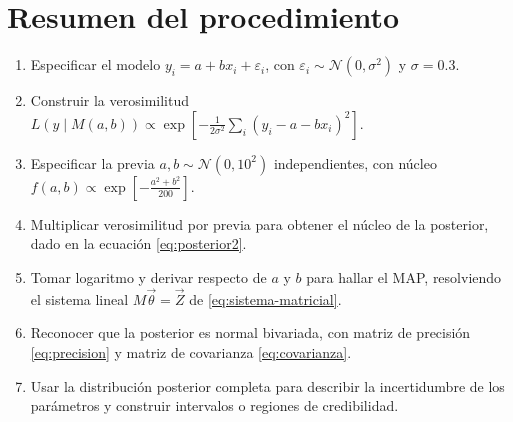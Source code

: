 \documentclass[11pt]{article}
\theoremstyle{remark}
\begin{document}
\section{Resumen del procedimiento}

\begin{enumerate}
  \item Especificar el modelo $y_i=a+bx_i+\varepsilon_i$, con
        $\varepsilon_i\sim\mathcal N(0,\sigma^2)$ y $\sigma=0.3$.
  \item Construir la verosimilitud
        $L(y\mid M(a,b))\propto
        \exp\!\left[-\tfrac{1}{2\sigma^2}\sum_i(y_i-a-bx_i)^2\right]$.
  \item Especificar la previa $a,b\sim\mathcal N(0,10^2)$ independientes, con
        núcleo $f(a,b)\propto\exp\!\left[-\tfrac{a^2+b^2}{200}\right]$.
  \item Multiplicar verosimilitud por previa para obtener el núcleo de la
        posterior, dado en la ecuación \eqref{eq:posterior2}.
  \item Tomar logaritmo y derivar respecto de $a$ y $b$ para hallar el MAP,
        resolviendo el sistema lineal $M\vec\theta=\vec Z$ de
        \eqref{eq:sistema-matricial}.
  \item Reconocer que la posterior es normal bivariada, con matriz de precisión
        \eqref{eq:precision} y matriz de covarianza \eqref{eq:covarianza}.
  \item Usar la distribución posterior completa para describir la incertidumbre
        de los parámetros y construir intervalos o regiones de credibilidad.
\end{enumerate}
\end{document}
